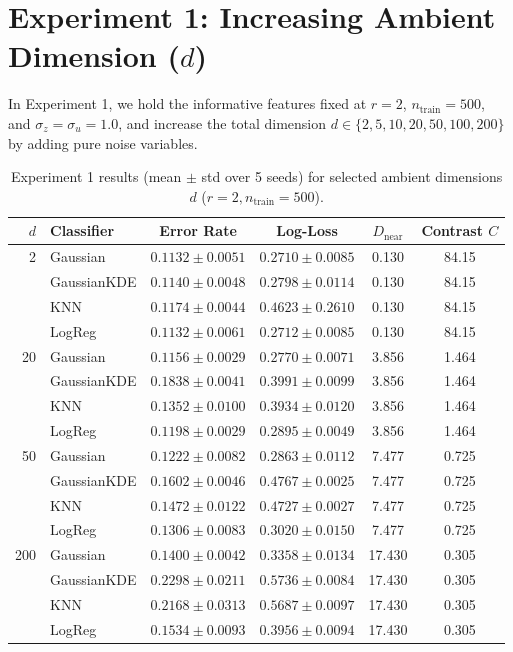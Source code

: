 \documentclass[11pt, a4paper]{article}
\begin{document}
\section{Experiment 1: Increasing Ambient Dimension ($d$)}

In Experiment 1, we hold the informative features fixed at $r = 2$, $n_{\text{train}} = 500$, and $\sigma_z = \sigma_u = 1.0$, and increase the total dimension $d \in \{2, 5, 10, 20, 50, 100, 200\}$ by adding pure noise variables.

\begin{table}[htbp]
\centering
\small
\caption{Experiment 1 results (mean $\pm$ std over 5 seeds) for selected ambient dimensions $d$ ($r=2, n_{\text{train}}=500$).}
\label{tab:exp1}
\begin{tabular}{rlcccc}
\toprule
$d$ & Classifier & Error Rate & Log-Loss & $D_{\text{near}}$ & Contrast $C$ \\
\midrule
2   & Gaussian   & $0.1132 \pm 0.0051$ & $0.2710 \pm 0.0085$ & 0.130  & 84.15 \\
    & GaussianKDE & $0.1140 \pm 0.0048$ & $0.2798 \pm 0.0114$ & 0.130  & 84.15 \\
    & KNN        & $0.1174 \pm 0.0044$ & $0.4623 \pm 0.2610$ & 0.130  & 84.15 \\
    & LogReg     & $0.1132 \pm 0.0061$ & $0.2712 \pm 0.0085$ & 0.130  & 84.15 \\
\midrule
20  & Gaussian   & $0.1156 \pm 0.0029$ & $0.2770 \pm 0.0071$ & 3.856  & 1.464 \\
    & GaussianKDE & $0.1838 \pm 0.0041$ & $0.3991 \pm 0.0099$ & 3.856  & 1.464 \\
    & KNN        & $0.1352 \pm 0.0100$ & $0.3934 \pm 0.0120$ & 3.856  & 1.464 \\
    & LogReg     & $0.1198 \pm 0.0029$ & $0.2895 \pm 0.0049$ & 3.856  & 1.464 \\
\midrule
50  & Gaussian   & $0.1222 \pm 0.0082$ & $0.2863 \pm 0.0112$ & 7.477  & 0.725 \\
    & GaussianKDE & $0.1602 \pm 0.0046$ & $0.4767 \pm 0.0025$ & 7.477  & 0.725 \\
    & KNN        & $0.1472 \pm 0.0122$ & $0.4727 \pm 0.0027$ & 7.477  & 0.725 \\
    & LogReg     & $0.1306 \pm 0.0083$ & $0.3020 \pm 0.0150$ & 7.477  & 0.725 \\
\midrule
200 & Gaussian   & $0.1400 \pm 0.0042$ & $0.3358 \pm 0.0134$ & 17.430 & 0.305 \\
    & GaussianKDE & $0.2298 \pm 0.0211$ & $0.5736 \pm 0.0084$ & 17.430 & 0.305 \\
    & KNN        & $0.2168 \pm 0.0313$ & $0.5687 \pm 0.0097$ & 17.430 & 0.305 \\
    & LogReg     & $0.1534 \pm 0.0093$ & $0.3956 \pm 0.0094$ & 17.430 & 0.305 \\
\bottomrule
\end{tabular}
\end{table}
\end{document}

